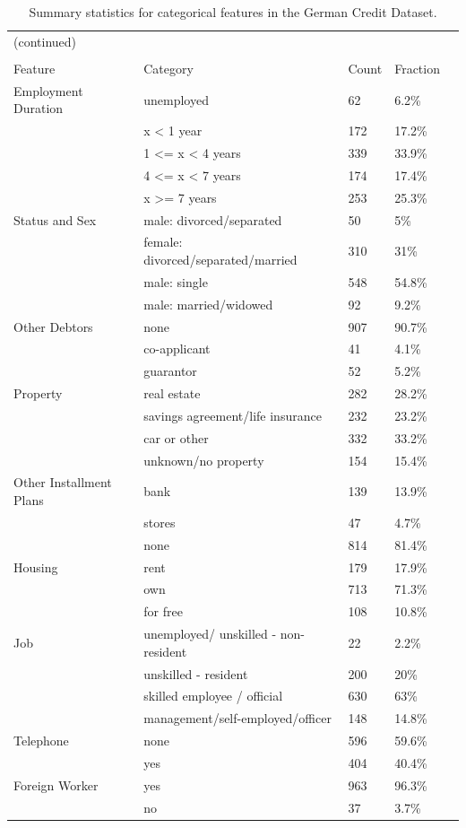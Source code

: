 \documentclass[12pt]{article}
\begin{document}
\begin{table}[!ht]
\centering
\begin{tabular}{lllll}
 (continued)& & &\\ \\
\hline
Feature & Category & Count & Fraction \\ 
  \hline
 Employment Duration & unemployed & 62 & 6.2\% \\ 
&x < 1 year & 172 & 17.2\% \\ 
&1  <= x < 4 years & 339 & 33.9\% \\ 
&4  <= x < 7 years & 174 & 17.4\% \\ 
&x >= 7 years & 253 & 25.3\% \\ 
\hline
Status and Sex & male: divorced/separated & 50 & 5\% \\ 
&female: divorced/separated/married & 310 & 31\% \\ 
&male: single & 548 & 54.8\% \\ 
&male: married/widowed & 92 & 9.2\% \\ 
\hline
 Other Debtors & none & 907 & 90.7\% \\ 
&co-applicant & 41 & 4.1\% \\ 
&guarantor & 52 & 5.2\% \\ 
\hline
  Property & real estate & 282 & 28.2\% \\ 
&savings agreement/life insurance & 232 & 23.2\% \\ 
&car or other& 332 & 33.2\% \\ 
&unknown/no property & 154 & 15.4\% \\ 
\hline
 Other Installment Plans & bank & 139 & 13.9\% \\ 
&stores & 47 & 4.7\% \\ 
&none & 814 & 81.4\% \\ 
\hline
Housing & rent & 179 & 17.9\% \\ 
&own & 713 & 71.3\% \\ 
&for free & 108 & 10.8\% \\ 
\hline
 Job & unemployed/ unskilled  - non-resident & 22 & 2.2\% \\ 
 & unskilled - resident & 200 & 20\% \\ 
 &skilled employee / official & 630 & 63\% \\ 
 &management/self-employed/officer & 148 & 14.8\% \\ 
 \hline
Telephone & none & 596 & 59.6\% \\ 
&yes & 404 & 40.4\% \\ 
 \hline
Foreign Worker & yes & 963 & 96.3\% \\ 
&no & 37 & 3.7\% \\ 
    \hline
\end{tabular}
\caption[Summary statistics for categorical features]{Summary statistics for categorical features in the German Credit Dataset.}\label{summary_categorical}
\end{table}
\end{document}
